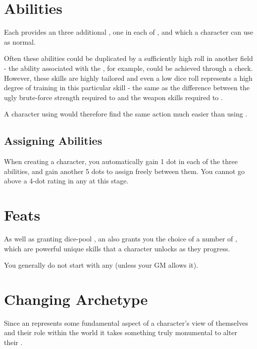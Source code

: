 \section{ Abilities} 

Each  provides an three additional , one in each of ,  and  which a character can use as normal. 

Often these abilities could be duplicated by a sufficiently high roll in another field - the  ability associated with the , for example, could be achieved through a  check. However, these skills are highly tailored and even a low dice roll represents a high degree of training in this particular skill - the same as the difference between the ugly brute-force strength required to  and the weapon skills required to .

A character using  would therefore find the same action much easier than using . 

\subsection{Assigning  Abilities} 

When creating a character, you automatically gain 1 dot in each of the three  abilities, and gain another 5 dots to assign freely between them.  You cannot go above a 4-dot rating in any  at this stage. 

\section{ Feats} 

As well as granting dice-pool , an  also grants you the choice of a number of , which are powerful unique skills that a character unlocks as they progress. 

You generally do not start with any  (unless your GM allows it). 


\section{Changing Archetype}

Since an  represents some fundamental aspect of a character's view of themselves and their role within the world it takes something truly monumental to alter their . 

